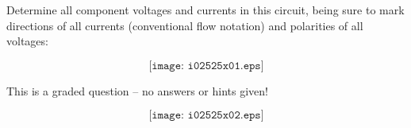 

Determine all component voltages and currents in this circuit, being sure to mark directions of all currents (conventional flow notation) and polarities of all voltages:

$$\texttt{[image: i02525x01.eps]}$$

\vfil 

\eject






This is a graded question -- no answers or hints given!







$$\texttt{[image: i02525x02.eps]}$$




